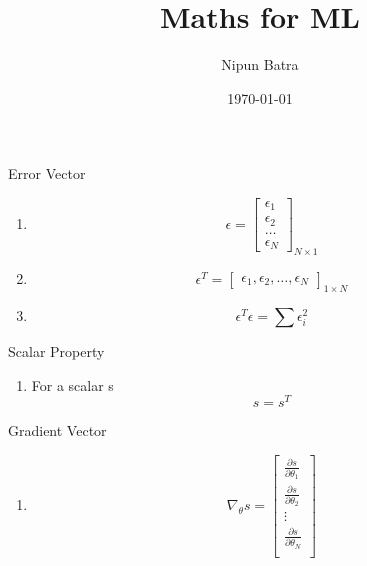 \documentclass{beamer}
\title{Maths for ML}
\date{\today}
\author{Nipun Batra}
\institute{IIT Gandhinagar}
\newcounter{saveenumi}
\newcommand{\seti}{\setcounter{saveenumi}{\value{enumi}}}
\newcommand{\conti}{\setcounter{enumi}{\value{saveenumi}}}
\begin{document}
  \maketitle


\begin{frame}{Error Vector}
\begin{enumerate}
\item 
$$
	\epsilon = \begin{bmatrix}
	\epsilon_{1}   \\
	\epsilon_{2}   \\
	\dots \\
	\epsilon_{N}
	\end{bmatrix}_{N \times 1}   
$$
	
\pause 
\item 
$$
	\epsilon^T = \begin{bmatrix}
	\epsilon_{1}, 
	\epsilon_{2},  
	\dots, 
	\epsilon_{N}
	\end{bmatrix}_{1 \times N}   
$$
	
\pause 
\item 
$$\epsilon^T\epsilon = \sum \epsilon_{i}^{2}$$
\seti
\end{enumerate}
\end{frame}

\begin{frame}{Scalar Property}
\begin{enumerate}
\conti
\item 
	For a scalar s
	$$
	s = s^{T}    
	$$
\seti
\end{enumerate}
\end{frame}

\begin{frame}{Gradient Vector}
\begin{enumerate}
\conti
\item 
$$
\nabla_\theta s = \begin{bmatrix}
  \frac{\partial s}{\partial \theta_{1}}\\
  \frac{\partial s}{\partial \theta_{2}}\\
    \vdots\\
  \frac{\partial s}{\partial \theta_{N}}\\
    \end{bmatrix}
$$
\seti
\end{enumerate}
\end{frame}
\end{document}
